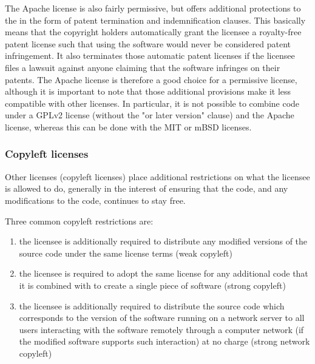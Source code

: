 \documentclass[10pt,a4paper]{article}
\begin{document}
The Apache license is also fairly permissive, but offers additional protections to the 
in the form of patent termination and indemnification clauses. This basically means 
that the copyright holders automatically grant the licensee a royalty-free patent license 
such that using the software would never be considered patent infringement. It also 
terminates those automatic patent licenses if the licensee files a lawsuit against anyone 
claiming that the software infringes on their patents. The Apache license is therefore 
a good choice for a permissive license, although it is important to note that those 
additional provisions make it less compatible with other licenses. In particular, it is 
not possible to combine code under a GPLv2 license (without the "or later version" 
clause) and the Apache license, whereas this can be done with the MIT or mBSD 
licenses. 

\subsubsection{Copyleft licenses}
\label{section:impnotes.recommended.copyleft}
\par Other licenses (copyleft licenses) place additional restrictions on what the 
licensee is allowed to do, generally in the interest of ensuring that the code, and 
any modifications to the code, continues to stay free. 

\par Three common copyleft restrictions are: 

\begin{enumerate}
\item the licensee is additionally required to distribute any modified versions of the 
source code under the same license terms (weak copyleft) \label{copyleft.weak}
\item the licensee is required to adopt the same license for any additional code that it 
is combined with to create a single piece of software (strong copyleft) \label{copyleft.strong}
\item the licensee is additionally required to distribute the source code which 
corresponds to the version of the software running on a network server to all 
users interacting with the software remotely through a computer network (if the 
modified software supports such interaction) at no charge (strong network copyleft) \label{copyleft.strong.network}
\end{enumerate}
\end{document}
